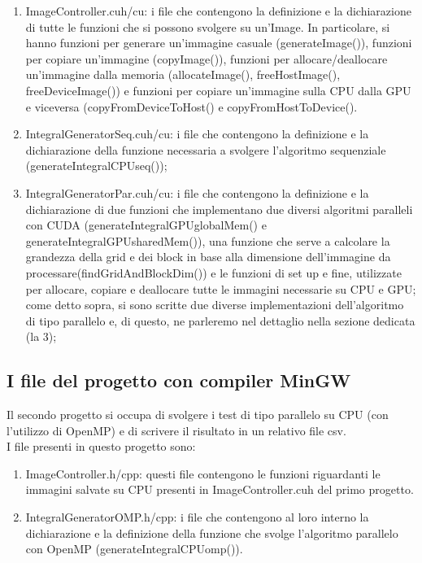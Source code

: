 \documentclass[10pt,twocolumn,letterpaper]{article}
\begin{document}
\begin{enumerate}
\item{ImageController.cuh/cu: i file che contengono la definizione e la dichiarazione di tutte le funzioni che si possono svolgere su un’Image. In particolare, si hanno funzioni per generare un’immagine casuale (generateImage()), funzioni per copiare un’immagine (copyImage()), funzioni per allocare/deallocare un’immagine dalla memoria (allocateImage(), freeHostImage(), freeDeviceImage()) e funzioni per copiare un’immagine sulla CPU dalla GPU e viceversa (copyFromDeviceToHost() e copyFromHostToDevice().}
\item{IntegralGeneratorSeq.cuh/cu: i file che contengono la definizione e la dichiarazione della funzione necessaria a svolgere l’algoritmo sequenziale (generateIntegralCPUseq());}
\item{IntegralGeneratorPar.cuh/cu: i file che contengono la definizione e la dichiarazione di due funzioni che implementano due diversi algoritmi paralleli con CUDA (generateIntegralGPUglobalMem() e generateIntegralGPUsharedMem()), una funzione che serve a calcolare la grandezza della grid e dei block in base alla dimensione dell'immagine da processare(findGridAndBlockDim()) e le funzioni di set up e fine, utilizzate per allocare, copiare e deallocare tutte le immagini necessarie su CPU e GPU; come detto sopra, si sono scritte due diverse implementazioni dell’algoritmo di tipo parallelo e, di questo, ne parleremo nel dettaglio nella sezione dedicata (la 3);}
\end{enumerate}


\subsection{I file del progetto con compiler MinGW}

Il secondo progetto si occupa di svolgere i test di tipo parallelo su CPU (con l’utilizzo di OpenMP) e di scrivere il risultato in un relativo file csv.\\
I file presenti in questo progetto sono:
\begin{enumerate}
\item{ImageController.h/cpp: questi file contengono le funzioni riguardanti le immagini salvate su CPU presenti in ImageController.cuh del primo progetto.}
\item{IntegralGeneratorOMP.h/cpp: i file che contengono al loro interno la dichiarazione e la definizione della funzione che svolge l’algoritmo parallelo con OpenMP (generateIntegralCPUomp()).}

\end{enumerate}
\end{document}
